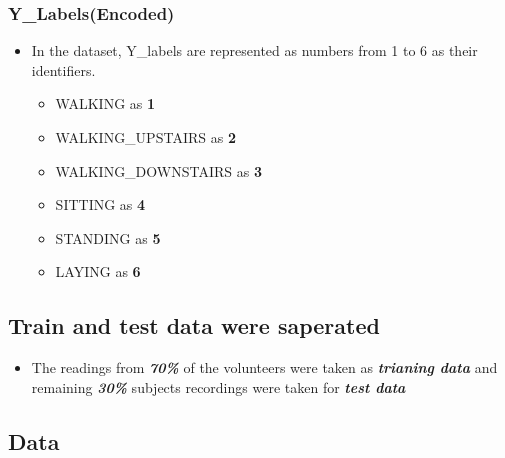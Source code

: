 \documentclass[11pt]{article}
\providecommand{\tightlist}{%
      \setlength{\itemsep}{0pt}\setlength{\parskip}{0pt}}
\begin{document}
\subsubsection{Y\_Labels(Encoded)}\label{y_labelsencoded}

\begin{itemize}
\item
  In the dataset, Y\_labels are represented as numbers from 1 to 6 as
  their identifiers.

  \begin{itemize}
  \tightlist
  \item
    WALKING as \textbf{1}
  \item
    WALKING\_UPSTAIRS as \textbf{2}
  \item
    WALKING\_DOWNSTAIRS as \textbf{3}
  \item
    SITTING as \textbf{4}
  \item
    STANDING as \textbf{5}
  \item
    LAYING as \textbf{6}
  \end{itemize}
\end{itemize}

\subsection{Train and test data were
saperated}\label{train-and-test-data-were-saperated}

\begin{itemize}
\tightlist
\item
  The readings from \textbf{\emph{70\%}} of the volunteers were taken as
  \textbf{\emph{trianing data}} and remaining \textbf{\emph{30\%}}
  subjects recordings were taken for \textbf{\emph{test data}}
\end{itemize}

\subsection{Data}\label{data}
\end{document}

